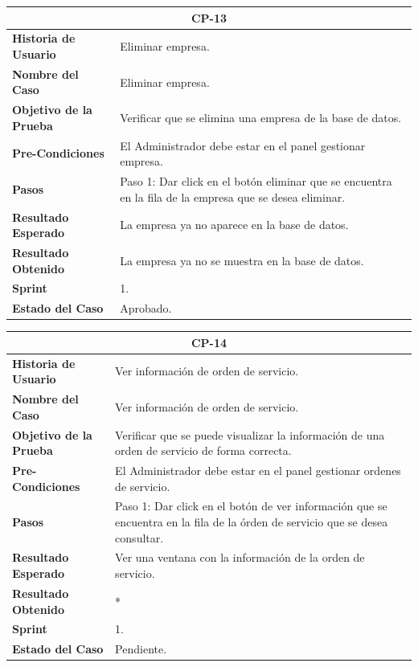 \documentclass[12pt,a4paper]{article}
\begin{document}
\begin{center}
\begin{tabular}{|m{5cm}|m{9cm}|}
\hline
\multicolumn{2}{|c|}{\textbf{CP-13}} \\
\hline
\textbf{Historia de Usuario} & Eliminar empresa. \\
\hline
\textbf{Nombre del Caso} & Eliminar empresa. \\
\hline
\textbf{Objetivo de la Prueba} &  Verificar que se elimina una empresa de la base de datos.\\
\hline
\textbf{Pre-Condiciones} & El Administrador debe estar en el panel gestionar empresa. \\
\hline
\textbf{Pasos} & Paso 1: Dar click en el botón eliminar que se encuentra en la fila de la empresa que se desea eliminar. \\
\hline
\textbf{Resultado Esperado} & La empresa ya no aparece en la base de datos. \\
\hline
\textbf{Resultado Obtenido} & La empresa ya no se muestra en la base de datos. \\
\hline
\textbf{Sprint} & 1. \\
\hline
\textbf{Estado del Caso} & Aprobado. \\
\hline
\end{tabular}
\vspace{5mm}

\begin{tabular}{|m{5cm}|m{9cm}|}
\hline
\multicolumn{2}{|c|}{\textbf{CP-14}} \\
\hline
\textbf{Historia de Usuario} & Ver información de orden de servicio. \\
\hline
\textbf{Nombre del Caso} & Ver información de orden de servicio. \\
\hline
\textbf{Objetivo de la Prueba} & Verificar que se puede visualizar la información de una orden de servicio de forma correcta. \\
\hline
\textbf{Pre-Condiciones} & El Administrador debe estar en el panel gestionar ordenes de servicio. \\
\hline
\textbf{Pasos} & Paso 1: Dar click en el botón de ver información que se encuentra en la fila de la órden de servicio que se desea consultar. \\
\hline
\textbf{Resultado Esperado} & Ver una ventana con la información de la orden de servicio. \\
\hline
\textbf{Resultado Obtenido} & * \\
\hline
\textbf{Sprint} & 1. \\
\hline
\textbf{Estado del Caso} & Pendiente. \\
\hline
\end{tabular}
\vspace{5mm}


\end{center}
\end{document}
